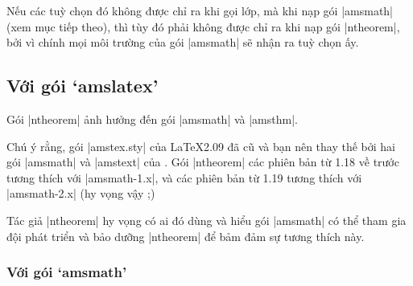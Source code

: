 \medskip
Nếu các tuỳ chọn đó không được chỉ ra khi gọi lớp, mà khi nạp gói |amsmath|
(xem mục tiếp theo), thì tùy đó phải không được chỉ ra khi nạp gói |ntheorem|,
bởi vì chính mọi môi trường của gói |amsmath| sẽ nhận ra tuỳ chọn ấy.

\subsection{Với gói `amslatex'}
\label{sec:amslatex}

Gói |ntheorem| ảnh hưởng đến gói |amsmath| và |amsthm|.

\medskip
Chú ý rằng, gói |amstex.sty| của \LaTeX{}2.09 đã cũ và bạn nên thay thế
bởi hai gói |amsmath| và |amstext| của \LaTeXe{}. Gói |ntheorem| các phiên
bản từ 1.18 về trước tương thích với |amsmath-1.x|, và các phiên bản từ 1.19
tương thích với |amsmath-2.x| (hy vọng vậy ;)

\medskip
Tác giả |ntheorem| hy vọng có ai đó dùng và hiểu gói |amsmath| có thể
tham gia đội phát triển và bảo dưỡng |ntheorem| để bảm đảm sự tương thích này.

\subsubsection{Với gói `amsmath'}

